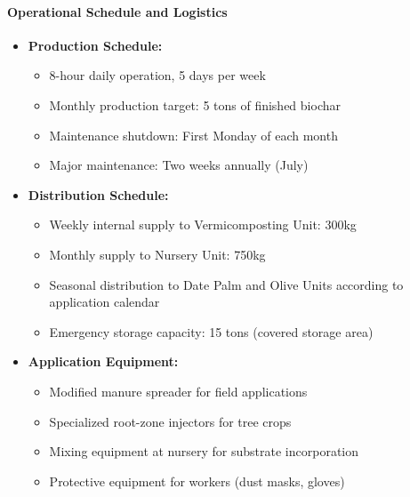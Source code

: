 \paragraph{Operational Schedule and Logistics}
\begin{itemize}
    \item \textbf{Production Schedule:} 
    \begin{itemize}
        \item 8-hour daily operation, 5 days per week
        \item Monthly production target: 5 tons of finished biochar
        \item Maintenance shutdown: First Monday of each month
        \item Major maintenance: Two weeks annually (July)
    \end{itemize}
    
    \item \textbf{Distribution Schedule:}
    \begin{itemize}
        \item Weekly internal supply to Vermicomposting Unit: 300kg
        \item Monthly supply to Nursery Unit: 750kg
        \item Seasonal distribution to Date Palm and Olive Units according to application calendar
        \item Emergency storage capacity: 15 tons (covered storage area)
    \end{itemize}
    
    \item \textbf{Application Equipment:}
    \begin{itemize}
        \item Modified manure spreader for field applications
        \item Specialized root-zone injectors for tree crops
        \item Mixing equipment at nursery for substrate incorporation
        \item Protective equipment for workers (dust masks, gloves)
    \end{itemize}
\end{itemize}

